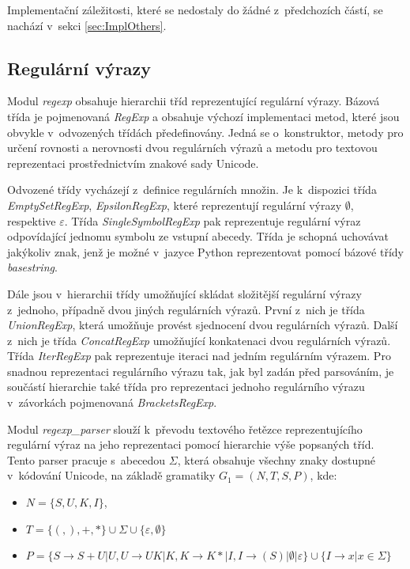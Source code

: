 \documentclass[10pt, notitlepage]{article}
\begin{document}
Implementační záležitosti, které se nedostaly do žádné z~předchozích částí, se
nachází v~sekci \ref{sec:ImplOthers}.

\subsection{Regulární výrazy}
\label{sec:ImplRegExps}

Modul \emph{regexp} obsahuje hierarchii tříd reprezentující regulární výrazy.
Bázová třída je pojmenovaná \emph{RegExp} a obsahuje výchozí implementaci metod,
které jsou obvykle v~odvozených třídách předefinovány. Jedná se o~konstruktor,
metody pro určení rovnosti a nerovnosti dvou regulárních výrazů a metodu pro
textovou reprezentaci prostřednictvím znakové sady Unicode.

Odvozené třídy vycházejí z~definice regulárních množin. Je k~dispozici třída
\emph{EmptySetRegExp}, \emph{EpsilonRegExp}, které reprezentují regulární výrazy
$\emptyset$, respektive $\varepsilon$. Třída \emph{SingleSymbolRegExp} pak
reprezentuje regulární výraz odpovídající jednomu symbolu ze vstupní abecedy.
Třída je schopná uchovávat jakýkoliv znak, jenž je možné v~jazyce Python
reprezentovat pomocí bázové třídy \emph{basestring}.

Dále jsou v~hierarchii třídy umožňující skládat složitější regulární výrazy
z~jednoho, případně dvou jiných regulárních výrazů. První z~nich je třída
\emph{UnionRegExp}, která umožňuje provést sjednocení dvou regulárních výrazů.
Další z~nich je třída \emph{ConcatRegExp} umožňující konkatenaci dvou
regulárních výrazů. Třída \emph{IterRegExp} pak reprezentuje iteraci nad jedním
regulárním výrazem. Pro snadnou reprezentaci regulárního výrazu tak, jak byl
zadán před parsováním, je součástí hierarchie také třída pro reprezentaci jednoho
regulárního výrazu v~závorkách pojmenovaná \emph{BracketsRegExp}.

Modul \emph{regexp\_parser} slouží k~převodu textového řetězce reprezentujícího
regulární výraz na jeho reprezentaci pomocí hierarchie výše popsaných tříd.
Tento parser pracuje s~abecedou $\Sigma$, která obsahuje všechny znaky dostupné
v~kódování Unicode, na základě gramatiky $G_1 = (N, T, S, P)$, kde:

\begin{itemize}
	\item $N = \{S, U, K, I\}$,

	\item $T = \{(, ), +, *\} \cup  \Sigma \cup \{\varepsilon, \emptyset\}$

	\item $P = \{S \rightarrow S+U | U, U \rightarrow UK | K, K \rightarrow K* |
		I, I \rightarrow (S) | \emptyset | \varepsilon\} \cup \{I \rightarrow x |
		x \in \Sigma\}$
\end{itemize}
\end{document}
